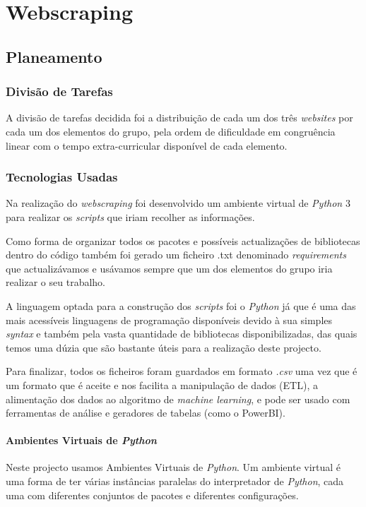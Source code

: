 \chapter{Webscraping}
\label{cap3}

\section{Planeamento}
\subsection{Divisão de Tarefas}

A divisão de tarefas decidida foi a distribuição de cada um dos três \textit{websites} por cada um dos elementos do grupo, pela ordem de dificuldade em congruência linear com o tempo extra-curricular disponível de cada elemento.

\subsection{Tecnologias Usadas}
Na realização do \textit{webscraping} foi desenvolvido um ambiente virtual de \textit{Python} 3 para realizar os \textit{scripts} que iriam recolher as informações.

Como forma de organizar todos os pacotes e possíveis actualizações de bibliotecas dentro do código também foi gerado um ficheiro .txt denominado \textit{requirements} que actualizávamos e usávamos sempre que um dos elementos do grupo iria realizar o seu trabalho.

A linguagem optada para a construção dos \textit{scripts} foi o \textit{Python} já que é uma das mais acessíveis linguagens de programação disponíveis devido à sua simples \textit{syntax} e também pela vasta quantidade de bibliotecas disponibilizadas, das quais temos uma dúzia que são bastante úteis para a realização deste projecto.

Para finalizar, todos os ficheiros foram guardados em formato \textit{.csv} uma vez que é um formato que é aceite e nos facilita a manipulação de dados (ETL), a alimentação dos dados ao algoritmo de \textit{machine learning}, e pode ser usado com ferramentas de análise e geradores de tabelas (como o PowerBI).

\subsubsection{Ambientes Virtuais de \textit{Python}}
Neste projecto usamos Ambientes Virtuais de \textit{Python}. Um ambiente virtual é uma forma de ter várias instâncias paralelas do interpretador de \textit{Python}, cada uma com diferentes conjuntos de pacotes e diferentes configurações.

